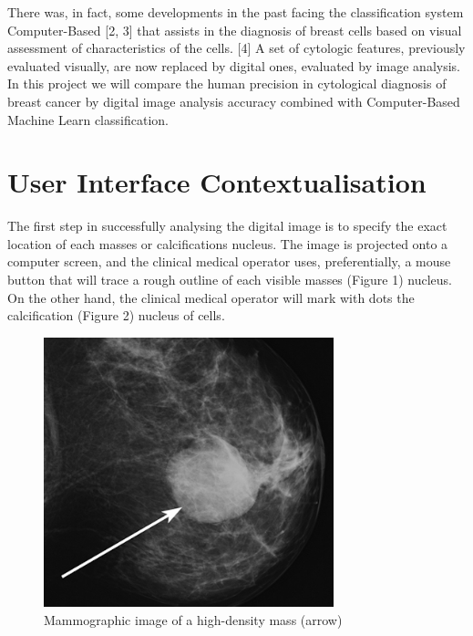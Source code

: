 There was, in fact, some developments in the past facing the classification system Computer-Based [2, 3] that assists in the diagnosis of breast cells based on visual assessment of characteristics of the cells. [4] A set of cytologic features, previously evaluated visually, are now replaced by digital ones, evaluated by image analysis. In this project we will compare the human precision in cytological diagnosis of breast cancer by digital image analysis accuracy combined with Computer-Based Machine Learn classification.

\section{User Interface Contextualisation}

The first step in successfully analysing the digital image is to specify the exact location of each masses or calcifications nucleus. The image is projected onto a computer screen, and the clinical medical operator uses, preferentially, a mouse button that will trace a rough outline of each visible masses (Figure 1) nucleus. On the other hand, the clinical medical operator will mark with dots the calcification (Figure 2) nucleus of cells.

\begin{figure}[!hbt]
\centering
\includegraphics[width=0.75\textwidth]{masses.png}
\caption{\label{fig:frog}Mammographic image of a high-density mass (arrow)
}
\end{figure}


